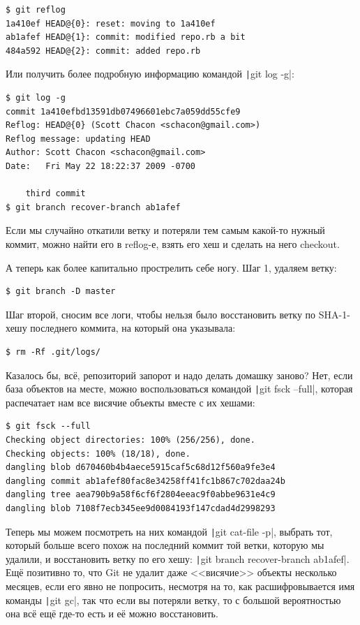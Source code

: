 \documentclass[a5paper]{article}
\begin{document}
\begin{verbatim}
$ git reflog
1a410ef HEAD@{0}: reset: moving to 1a410ef
ab1afef HEAD@{1}: commit: modified repo.rb a bit
484a592 HEAD@{2}: commit: added repo.rb
\end{verbatim}

Или получить более подробную информацию командой \texttt|git log -g|:

\begin{verbatim}
$ git log -g
commit 1a410efbd13591db07496601ebc7a059dd55cfe9
Reflog: HEAD@{0} (Scott Chacon <schacon@gmail.com>)
Reflog message: updating HEAD
Author: Scott Chacon <schacon@gmail.com>
Date:   Fri May 22 18:22:37 2009 -0700

    third commit
$ git branch recover-branch ab1afef
\end{verbatim}

Если мы случайно откатили ветку и потеряли тем самым какой-то нужный коммит, можно найти его в reflog-е, взять его хеш и сделать на него checkout.

А теперь как более капитально прострелить себе ногу. Шаг 1, удаляем ветку:

\begin{verbatim}
$ git branch -D master
\end{verbatim}

Шаг второй, сносим все логи, чтобы нельзя было восстановить ветку по SHA-1-хешу последнего коммита, на который она указывала:

\begin{verbatim}
$ rm -Rf .git/logs/
\end{verbatim}

Казалось бы, всё, репозиторий запорот и надо делать домашку заново? Нет, если база объектов на месте, можно воспользоваться командой \texttt|git fsck --full|, которая распечатает нам все висячие объекты вместе с их хешами:

\begin{verbatim}
$ git fsck --full
Checking object directories: 100% (256/256), done.
Checking objects: 100% (18/18), done.
dangling blob d670460b4b4aece5915caf5c68d12f560a9fe3e4
dangling commit ab1afef80fac8e34258ff41fc1b867c702daa24b
dangling tree aea790b9a58f6cf6f2804eeac9f0abbe9631e4c9
dangling blob 7108f7ecb345ee9d0084193f147cdad4d2998293
\end{verbatim}

Теперь мы можем посмотреть на них командой \texttt|git cat-file -p|, выбрать тот, который больше всего похож на последний коммит той ветки, которую мы удалили, и восстановить ветку по его хешу: \texttt|git branch recover-branch ab1afef|. Ещё позитивно то, что Git не удалит даже <<висячие>> объекты несколько месяцев, если его явно не попросить, несмотря на то, как расшифровывается имя команды \texttt|git gc|, так что если вы потеряли ветку, то с большой вероятностью она всё ещё где-то есть и её можно восстановить.
\end{document}
